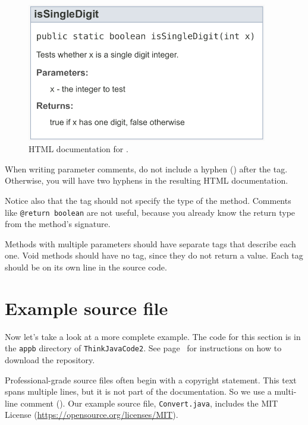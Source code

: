 \begin{figure}[!ht]
\begin{center}
\includegraphics[width=298pt]{figs/javadoc.pdf}
\caption{HTML documentation for .}
\label{fig.javadoc}
\end{center}
\end{figure}

When writing parameter comments, do not include a hyphen (\java{-}) after the  tag.
Otherwise, you will have two hyphens in the resulting HTML documentation.

Notice also that the  tag should not specify the type of the method.
Comments like \textcolor{comment}{\tt @return boolean} are not useful, because you already know the return type from the method's signature.

Methods with multiple parameters should have separate  tags that describe each one.
Void methods should have no  tag, since they do not return a value.
Each tag should be on its own line in the source code.


\section{Example source file}

Now let's take a look at a more complete example.
The code for this section is in the {\tt appb} directory of {\tt ThinkJavaCode2}.
See page~\pageref{code} for instructions on how to download the repository.

Professional-grade source files often begin with a copyright statement.
This text spans multiple lines, but it is not part of the documentation.
So we use a multi-line comment (\java{/*}).
Our example source file, {\tt Convert.java}, includes the MIT License (\url{https://opensource.org/licenses/MIT}).


